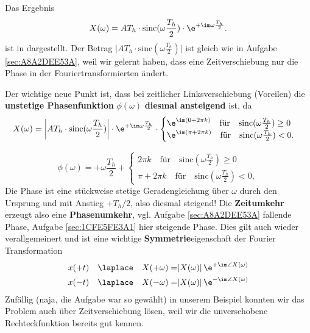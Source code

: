 \begin{Loesung}
Das Ergebnis
\begin{equation}
\label{eq:1CFE5FE3A1_Loesung}
X(\omega) = A T_h \cdot \mathrm{sinc}(\omega\frac{T_h}{2}) \cdot  \e^{+\im\omega\frac{T_h}{2}}.
\end{equation}
ist in  dargestellt. Der Betrag
$\bigg|A T_h \cdot \mathrm{sinc}(\omega\frac{T_h}{2})\bigg|$
ist gleich wie in Aufgabe \ref{sec:A8A2DEE53A}, weil wir gelernt haben, dass
eine Zeitverschiebung nur die Phase in der Fouriertransformierten ändert.
%

Der wichtige neue Punkt ist, dass bei zeitlicher Linksverschiebung (Voreilen)
die \textbf{unstetige Phasenfunktion} $\phi(\omega)$
\textbf{diesmal ansteigend} ist,  da
\begin{equation}
X(\omega) = \bigg|A T_h \cdot \mathrm{sinc}(\omega\frac{T_h}{2})\bigg|
\cdot  \e^{+\im\omega\frac{T_h}{2}}\cdot
\begin{cases}
\e^{\im (0+2\pi k)}\quad \text{für}\quad \mathrm{sinc}(\omega\frac{T_h}{2})\geq0\\
\e^{\im (\pi + 2\pi k)}\quad \text{für}\quad\mathrm{sinc}(\omega\frac{T_h}{2})<0.
\end{cases}
\end{equation}

\begin{equation}
\phi(\omega) = +\omega\frac{T_h}{2} +
\begin{cases}
2\pi k\quad \text{für}\quad \mathrm{sinc}(\omega\frac{T_h}{2})\geq0\\
\pi + 2\pi k\quad \text{für}\quad\mathrm{sinc}(\omega\frac{T_h}{2})<0,
\end{cases}
\end{equation}
Die Phase ist eine stückweise stetige Geradengleichung über $\omega$ durch den
Ursprung und mit Anstieg $+T_h/2$, also diesmal steigend!
%
Die \textbf{Zeitumkehr} erzeugt also eine \textbf{Phasenumkehr}, vgl.
Aufgabe \ref{sec:A8A2DEE53A} fallende Phase, Aufgabe \ref{sec:1CFE5FE3A1} hier steigende Phase.
%
Dies gilt auch wieder verallgemeinert und ist eine wichtige \textbf{Symmetrie}eigenschaft
der Fourier Transformation
%
\begin{align}
x(+t) \quad \laplace \quad X(+\omega) =& |X(\omega)| \, \e^{+\im\angle X(\omega)}\\
x(-t) \quad \laplace \quad X(-\omega) =& |X(\omega)| \, \e^{-\im\angle X(\omega)}
\end{align}
%
Zufällig (naja, die Aufgabe war so gewählt)
in unserem Beispiel konnten wir das Problem auch über Zeitverschiebung
lösen, weil wir die unverschobene Rechteckfunktion bereits gut kennen.
\end{Loesung}

